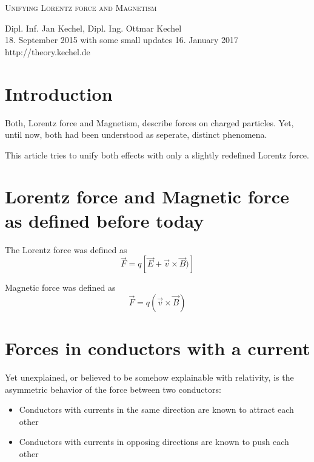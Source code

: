 \documentclass[12pt,a4paper,twocolumn]{article}
\begin{document}
%
%
\begin{titlepage}
\begin{center}
\vspace{1.5cm}

\Large \textsc{Unifying Lorentz force and Magnetism}

\vspace{6mm}

	\normalsize 
  Dipl. Inf. Jan Kechel, Dipl. Ing. Ottmar Kechel\\
	\vspace{6mm}
	18. September 2015 with some small updates 16. January 2017\\
	\vspace{6mm}
    http://theory.kechel.de
\end{center}

\vspace{1.5cm}
\tableofcontents
\end{titlepage}

\section{Introduction}
Both, Lorentz force and Magnetism, describe forces on charged particles. Yet, until now, both had been understood as seperate, distinct phenomena.

This article tries to unify both effects with only a slightly redefined Lorentz force.

\section{Lorentz force and Magnetic force as defined before today}
The Lorentz force was defined as $$\vec{F}=q[\vec{E}+\vec{v} \times \vec{B})]$$

Magnetic force was defined as $$\vec{F}=q(\vec{v} \times \vec{B})$$

\section{Forces in conductors with a current}

Yet unexplained, or believed to be somehow explainable with relativity, is the asymmetric behavior of the force between two conductors:
\begin{itemize}
  \item Conductors with currents in the same direction are known to attract each other
  \item Conductors with currents in opposing directions are known to push each other
\end{itemize}
\end{document}
